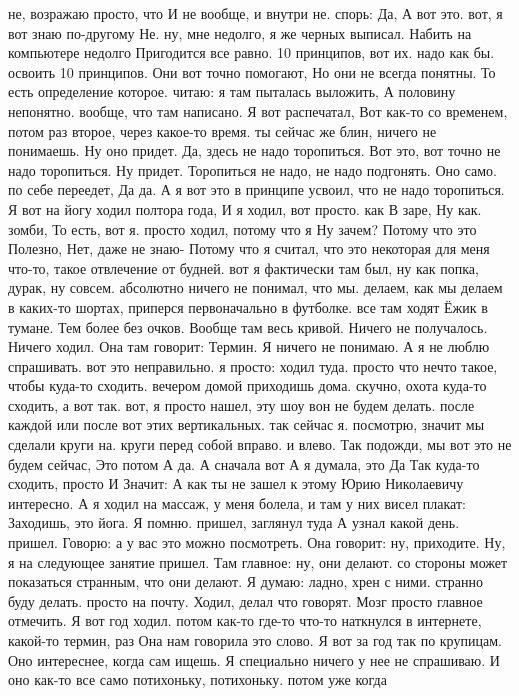 не, возражаю просто, что И не вообще, и внутри не.
спорь: Да, А вот это. вот, я вот знаю по-другому Не.
ну, мне недолго, я же черных выписал.
Набить на компьютере недолго Пригодится все равно.
10 принципов, вот их.
надо как бы.
освоить 10 принципов. Они вот точно помогают, Но они не всегда понятны. То есть определение которое.
читаю: я там пыталась выложить, А половину непонятно.
вообще, что там написано.
Я вот распечатал, Вот как-то со временем, потом раз второе, через какое-то время. ты сейчас же блин, ничего не понимаешь.
Ну оно придет.
Да, здесь не надо торопиться.
Вот это, вот точно не надо торопиться.
Ну придет.
Торопиться не надо, не надо подгонять.
Оно само.
по себе переедет, Да да.
А я вот это в принципе усвоил, что не надо торопиться. Я вот на йогу ходил полтора года, И я
ходил, вот просто.
как В заре, Ну как.
зомби, То есть, вот я.
просто ходил, потому что я Ну зачем? Потому что это Полезно, Нет, даже не знаю- Потому что я считал, что это некоторая для меня что-то, такое отвлечение от будней. вот я фактически там был, ну как попка, дурак, ну совсем.
абсолютно ничего не понимал, что мы.
делаем, как мы делаем в каких-то шортах, приперся первоначально в футболке. все там ходят Ёжик в тумане.
Тем более без очков.
Вообще там весь кривой.
Ничего не получалось.
Ничего ходил.
Она там говорит:
Термин.
Я ничего не понимаю.
А я не люблю спрашивать.
вот это неправильно. я просто:
ходил туда. просто что нечто такое, чтобы куда-то сходить. вечером домой приходишь дома.
скучно, охота куда-то сходить, а вот так.
вот, я просто нашел, эту шоу вон не будем делать.
после каждой или после вот этих вертикальных.
так сейчас я.
посмотрю, значит мы сделали круги на.
круги перед собой вправо.
и влево. Так подожди, мы вот это не будем сейчас, Это потом А да.
А сначала вот А я думала, это Да Так куда-то сходить, просто И Значит: А как ты не зашел к этому Юрию Николаевичу интересно.
А я ходил на массаж, у меня болела, и там у них висел плакат: Заходишь, это йога. Я помню.
пришел, заглянул туда А узнал какой день.
пришел.
Говорю: а у вас это можно посмотреть.
Она говорит: ну, приходите.
Ну, я на следующее занятие пришел.
Там главное: ну, они делают. со стороны может показаться странным, что они делают.
Я думаю: ладно, хрен с ними. странно буду делать.
просто на почту.
Ходил, делал что говорят.
Мозг просто главное отмечить.
Я вот год ходил. потом как-то где-то что-то наткнулся в интернете, какой-то термин, раз Она нам говорила это слово.
Я вот за год так по крупицам.
Оно интереснее, когда сам ищешь.
Я специально ничего у нее не спрашиваю.
И оно как-то все само потихоньку, потихоньку. потом уже когда
